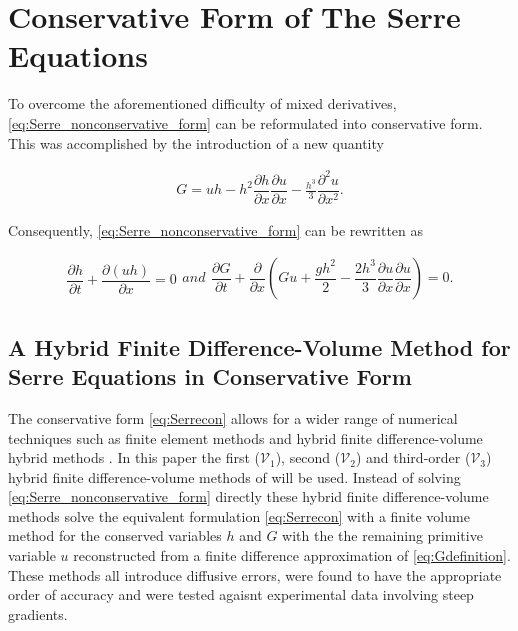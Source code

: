 \documentclass[SingleSpace,12pt,Journal]{Serre_ASCE}
\begin{document}
\section{Conservative Form of The Serre Equations}
To overcome the aforementioned difficulty of mixed derivatives, \eqref{eq:Serre_nonconservative_form} can be reformulated into conservative form. This was accomplished by the introduction of a new quantity \cite{Hank-etal-2010-2034,Zoppou-etal-2017}
\begin{linenomath*}
\begin{gather}
\label{eq:Gdefinition}
G = uh - h^2 \dfrac{\partial h}{\partial x} \dfrac{\partial u}{\partial x} - \frac{h^3}{3} \dfrac{\partial^2 u}{\partial x^2}.
\end{gather}
\end{linenomath*}
Consequently, \eqref{eq:Serre_nonconservative_form} can be rewritten as
\begin{linenomath*}
\begin{subequations}
\begin{gather}
\dfrac{\partial h}{\partial t} + \dfrac{\partial (uh)}{\partial x} = 0
\label{eq:Serrecon_continuity}
\end{gather}
and
\begin{gather}
\dfrac{\partial G}{\partial t} + \dfrac{\partial}{\partial x}\left(Gu + \dfrac{gh^2}{2} - \dfrac{2h^3}{3}\dfrac{\partial u}{\partial x}\dfrac{\partial u}{\partial x}\right) = 0.
\label{eq:Serrecon_momentum}
\end{gather}
\label{eq:Serrecon}
\end{subequations}
\end{linenomath*}

\subsection{A Hybrid Finite Difference-Volume Method for Serre Equations in Conservative Form}
\label{section:hybridmethod}
The conservative form \eqref{eq:Serrecon} allows for a wider range of numerical techniques such as finite element methods \cite{Guyenne-etal-2014-169} and hybrid finite difference-volume hybrid methods \cite{Hank-etal-2010-2034,Zoppou-2014}. In this paper the first ($\mathcal{V}_1$), second ($\mathcal{V}_2$) and third-order ($\mathcal{V}_3$) hybrid finite difference-volume methods of  will be used. Instead of solving \eqref{eq:Serre_nonconservative_form} directly these hybrid finite difference-volume methods solve the equivalent formulation \eqref{eq:Serrecon} with a finite volume method for the conserved variables $h$ and $G$ with the the remaining primitive variable $u$ reconstructed from a finite difference approximation of \eqref{eq:Gdefinition}. These methods all introduce diffusive errors, were found to have the appropriate order of accuracy and were tested agaisnt experimental data involving steep gradients.
\end{document}
